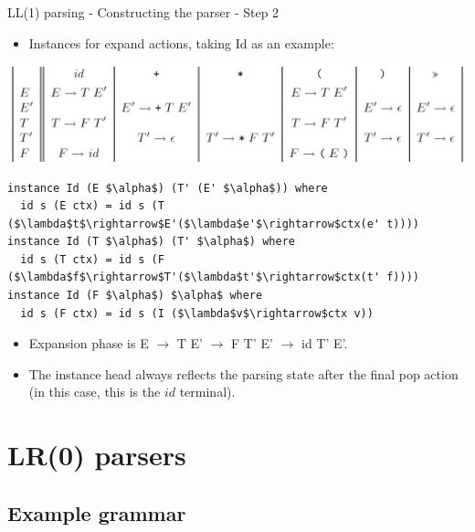 \documentclass[10pt]{beamer}
\begin{document}
\begin{frame}[fragile]{LL(1) parsing - Constructing the parser - Step 2}

\begin{itemize}
\item Instances for expand actions, taking Id as an example:
\end{itemize}

\includegraphics[scale=0.4]{parsing-table.png}

\begin{lstlisting}[mathescape=true, escapechar=!]
instance Id (E $\alpha$) (T' (E' $\alpha$)) where
  id s (E ctx) = id s (T ($\lambda$t$\rightarrow$E'($\lambda$e'$\rightarrow$ctx(e' t))))
instance Id (T $\alpha$) (T' $\alpha$) where
  id s (T ctx) = id s (F ($\lambda$f$\rightarrow$T'($\lambda$t'$\rightarrow$ctx(t' f))))
instance Id (F $\alpha$) $\alpha$ where
  id s (F ctx) = id s (I ($\lambda$v$\rightarrow$ctx v))
\end{lstlisting}

\begin{itemize}
\item Expansion phase is E $\rightarrow$ T E' $\rightarrow$ F T' E' $\rightarrow$ id T' E'.
\item The instance head always reflects the parsing state after the final pop action (in this case, this is the $id$ terminal).
\end{itemize}

\end{frame}

\section{LR(0) parsers}

\subsection{Example grammar}
\end{document}
